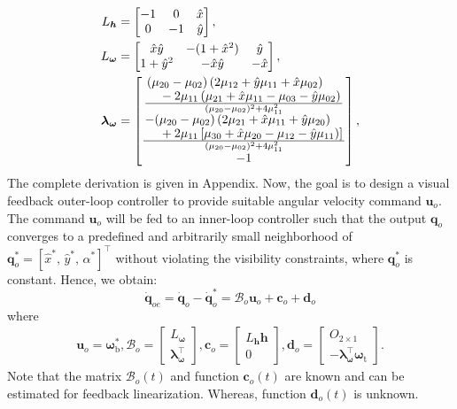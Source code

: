 \documentclass[lettersize,journal]{IEEEtran}
\begin{document}
\begin{align*}
    L_{\boldsymbol{h}} &= \begin{bmatrix} - 1 & 0 & \hat{x} \\ 0 & -1 & \hat{y}\end{bmatrix},\\
    L_{\boldsymbol{\omega}} &= \begin{bmatrix} \hat{x} \hat{y} & - (1 + \hat{x}^2) & \hat{y} \\
    1 + \hat{y}^2 & - \hat{x} \hat{y} & - \hat{x}\end{bmatrix}, \\
    \boldsymbol{\lambda}_{\boldsymbol{\omega}} 
    &= \begin{bmatrix} \frac{\splitfrac{(\mu_{20} - \mu_{02})\left( 2 \mu_{12} + \hat{y} \mu_{11} + \hat{x} \mu_{02} \right) }{ - 2 \mu_{11} \left( \mu_{21} + \hat{x} \mu_{11} - \mu_{03} - \hat{y} \mu_{02} \right)}}{(\mu_{20} - \mu_{02})^2 + 4 \mu_{11}^2} \\ \frac{\splitfrac{ - (\mu_{20} - \mu_{02})\left( 2 \mu_{21} + \hat{x} \mu_{11} + \hat{y} \mu_{20} \right) }{ + 2 \mu_{11} \left[ \mu_{30} + \hat{x} \mu_{20} - \mu_{12} - \hat{y} \mu_{11} ) \right]}}{(\mu_{20} - \mu_{02})^2 + 4 \mu_{11}^2} \\ -1 \end{bmatrix},
\end{align*}
The complete derivation is given in Appendix.
Now, the goal is to design a visual feedback outer-loop controller to provide suitable angular velocity command $\boldsymbol{u}_o$. The command $\boldsymbol{u}_o$ will be fed to an inner-loop controller such that the output $\boldsymbol{q}_o$ converges to a predefined and arbitrarily small neighborhood of $\boldsymbol{q}_o^* = [\hat{x}^*,\, \hat{y}^*,\, \alpha^*]^{\top}$ without violating the visibility constraints, where $\boldsymbol{q}_o^*$ is constant. Hence, we obtain:
\begin{equation} \label{perturbed system dynamics for outer loop: equation}
    \dot{\boldsymbol{q}}_{oe} = \dot{\boldsymbol{q}}_o - \dot{\boldsymbol{q}}_o^* = \mathcal{B}_o \boldsymbol{u}_o + \boldsymbol{c}_o + \boldsymbol{d}_o
\end{equation}
where
\begin{align*}
    \boldsymbol{u}_o = \boldsymbol{\omega}_{\text{b}}^*, 
    \mathcal{B}_o =\begin{bmatrix} L_{\boldsymbol{\omega}} \\ \boldsymbol{\lambda}_{\boldsymbol{\omega}}^{\top} \end{bmatrix},
    \boldsymbol{c}_o = \begin{bmatrix} L_{\boldsymbol{h}} \boldsymbol{h} \\ 0 \end{bmatrix}, 
    \boldsymbol{d}_o = \begin{bmatrix}  O_{2 \times 1} \\ -\boldsymbol{\lambda}_{\boldsymbol{\omega}}^{\top} \boldsymbol{\omega}_{\text{t}} \end{bmatrix}.
\end{align*}
Note that the matrix $\mathcal{B}_o(t)$ and function $\boldsymbol{c}_o(t)$ are known and can be estimated for feedback linearization. Whereas, function $\boldsymbol{d}_o(t)$ is unknown.
\end{document}
